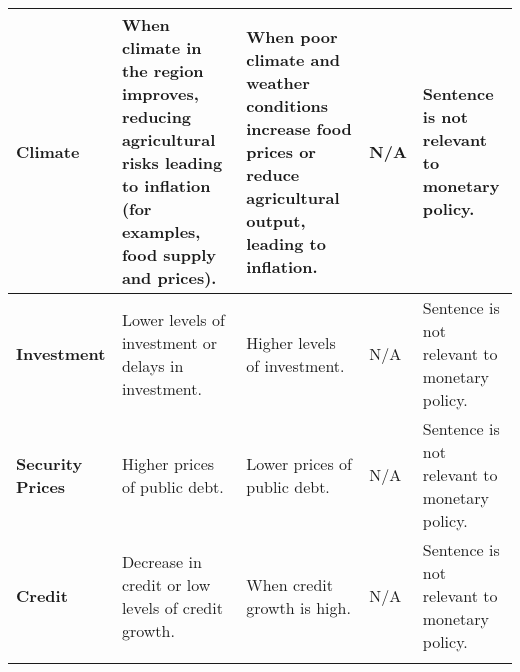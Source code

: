 \begin{longtable}{p{}p{}p{}p{}p{}}
\midrule
\textbf{Climate} & When climate in the region improves, reducing agricultural risks leading to inflation (for examples, food supply and prices). & When poor climate and weather conditions increase food prices or reduce agricultural output, leading to inflation. & N/A & Sentence is not relevant to monetary policy. \\
\midrule
\textbf{Investment} & Lower levels of investment or delays in investment. & Higher levels of investment. & N/A & Sentence is not relevant to monetary policy. \\
\midrule
\textbf{Security Prices} & Higher prices of public debt. & Lower prices of public debt. & N/A & Sentence is not relevant to monetary policy. \\
\midrule
\textbf{Credit} & Decrease in credit or low levels of credit growth. & When credit growth is high. & N/A & Sentence is not relevant to monetary policy. \\
\bottomrule
\label{tb:banrep_mp_stance_guide}
\end{longtable}
